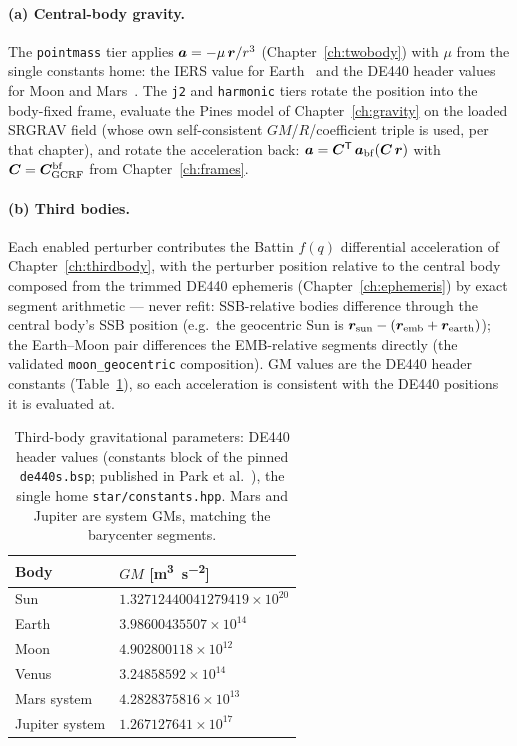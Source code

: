 \paragraph{(a) Central-body gravity.} The \texttt{pointmass} tier applies
$\bm{a} = -\mu\,\bm{r}/r^3$ (Chapter~\ref{ch:twobody}) with $\mu$ from the
single constants home: the IERS value for Earth~\cite{iers2010} and the
DE440 header values for Moon and Mars~\cite{park2021}. The \texttt{j2} and
\texttt{harmonic} tiers rotate the position into the body-fixed frame,
evaluate the Pines model of Chapter~\ref{ch:gravity} on the loaded SRGRAV
field (whose own self-consistent $GM$/$R$/coefficient triple is used, per
that chapter), and rotate the acceleration back:
$\bm{a} = \bm{C}^{\mathsf{T}}\,
\bm{a}_{\mathrm{bf}}(\bm{C}\,\bm{r})$ with
$\bm{C} = \bm{C}_{\mathrm{GCRF}}^{\mathrm{bf}}$ from Chapter~\ref{ch:frames}.

\paragraph{(b) Third bodies.} Each enabled perturber contributes the
Battin $f(q)$ differential acceleration of Chapter~\ref{ch:thirdbody},
with the perturber position relative to the central body composed from
the trimmed DE440 ephemeris (Chapter~\ref{ch:ephemeris}) by exact segment
arithmetic --- never refit: SSB-relative bodies difference through the
central body's SSB position (e.g.\ the geocentric Sun is
$\bm{r}_{\mathrm{sun}} - (\bm{r}_{\mathrm{emb}} +
\bm{r}_{\mathrm{earth}})$); the Earth--Moon pair differences the
EMB-relative segments directly (the validated
\texttt{moon\_geocentric} composition). GM values are the DE440 header
constants (Table~\ref{tab:env:gm}), so each acceleration is consistent
with the DE440 positions it is evaluated at.

\begin{table}[htbp]
  \centering
  \caption{Third-body gravitational parameters: DE440 header values
    (constants block of the pinned \texttt{de440s.bsp}; published in
    Park et al.~\cite{park2021}), the single home
    \texttt{star/constants.hpp}. Mars and Jupiter are system GMs,
    matching the barycenter segments.}
  \label{tab:env:gm}
  \begin{tabular}{ll}
    \hline
    Body & $GM$ [\unit{\metre\cubed\per\second\squared}] \\
    \hline
    Sun & $1.32712440041279419\times10^{20}$ \\
    Earth & $3.98600435507\times10^{14}$ \\
    Moon & $4.902800118\times10^{12}$ \\
    Venus & $3.24858592\times10^{14}$ \\
    Mars system & $4.2828375816\times10^{13}$ \\
    Jupiter system & $1.267127641\times10^{17}$ \\
    \hline
  \end{tabular}
\end{table}

